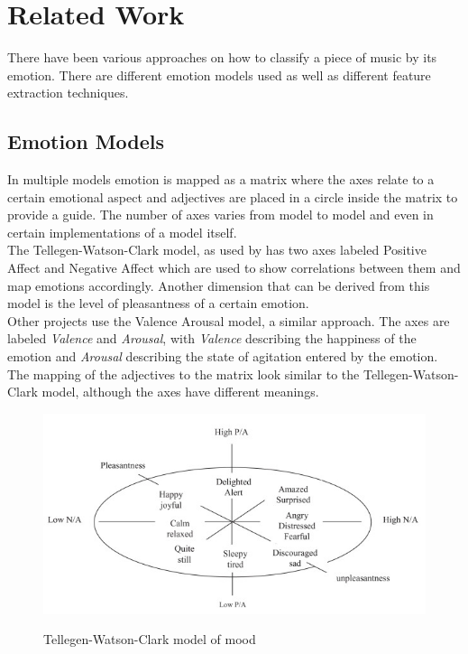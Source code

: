 \documentclass{sigchi-ext}
\begin{document}
\section{Related Work}
There have been various approaches on how to classify a piece of music by its emotion. There are different emotion models used as well as different feature extraction techniques.

\subsection{Emotion Models}
In multiple models emotion is mapped as a matrix where the axes relate to a certain emotional aspect and adjectives are placed in a circle inside the matrix to provide a guide. The number of axes varies from model to model and even in certain implementations of a model itself.\\
The Tellegen-Watson-Clark model, as used by \cite{Trohidis2011} has two axes labeled Positive Affect and Negative Affect which are used to show correlations between them and map emotions accordingly. Another dimension that can be derived from this model is the level of pleasantness of a certain emotion.\\

Other projects use the Valence Arousal model, a similar approach. The axes are labeled \textit{Valence} and \textit{Arousal}, with \textit{Valence} describing the happiness of the emotion and \textit{Arousal} describing the state of agitation entered by the emotion. The mapping of the adjectives to the matrix look similar to the Tellegen-Watson-Clark model, although the axes have different meanings.

\begin{figure}
	\label{tellegen-nwatson-clark}
	\includegraphics[width=\linewidth]{images/tellegen-watson-clark-model.jpg}
	\caption{Tellegen-Watson-Clark model of mood} \cite{Tellegen1999}
\end{figure}
\end{document}
